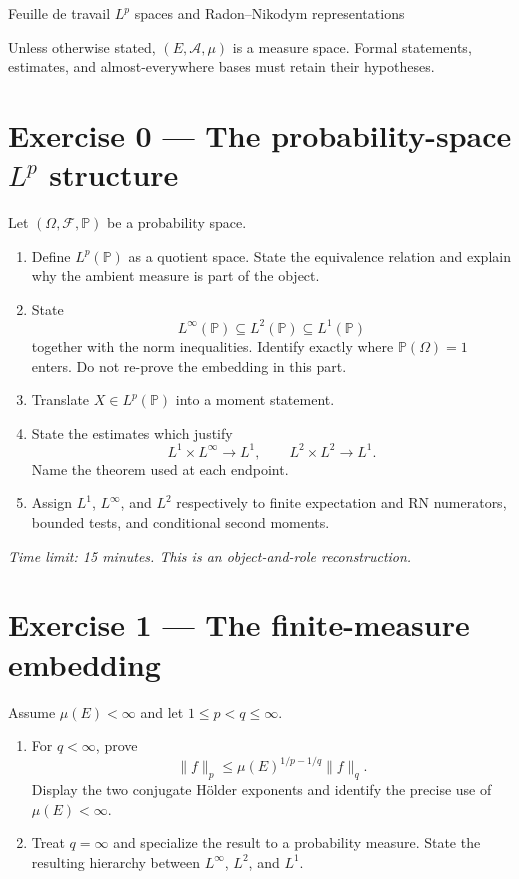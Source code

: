 \sheettitle
  {Feuille de travail}
  {$L^p$ spaces and Radon--Nikodym representations}

Unless otherwise stated, $(E,\mathcal A,\mu)$ is a measure space. Formal statements, estimates, and almost-everywhere bases must retain their hypotheses.

\section*{Exercise 0 — The probability-space $L^p$ structure}

Let $(\Omega,\mathcal F,\mathbb P)$ be a probability space.
\begin{enumerate}
  \item Define $L^p(\mathbb P)$ as a quotient space. State the equivalence relation and explain why the ambient measure is part of the object.
  \item State
  \[
  L^\infty(\mathbb P)
  \subseteq
  L^2(\mathbb P)
  \subseteq
  L^1(\mathbb P)
  \]
  together with the norm inequalities. Identify exactly where $\mathbb P(\Omega)=1$ enters. Do not re-prove the embedding in this part.
  \item Translate $X\in L^p(\mathbb P)$ into a moment statement.
  \item State the estimates which justify
  \[
  L^1\times L^\infty\longrightarrow L^1,
  \qquad
  L^2\times L^2\longrightarrow L^1.
  \]
  Name the theorem used at each endpoint.
  \item Assign $L^1$, $L^\infty$, and $L^2$ respectively to finite expectation and RN numerators, bounded tests, and conditional second moments.
\end{enumerate}

\emph{Time limit: 15 minutes. This is an object-and-role reconstruction.}

\section*{Exercise 1 — The finite-measure embedding}

Assume $\mu(E)<\infty$ and let $1\le p<q\le\infty$.
\begin{enumerate}
  \item For $q<\infty$, prove
  \[
  \|f\|_p
  \le
  \mu(E)^{1/p-1/q}\|f\|_q.
  \]
  Display the two conjugate Hölder exponents and identify the precise use of $\mu(E)<\infty$.
  \item Treat $q=\infty$ and specialize the result to a probability measure. State the resulting hierarchy between $L^\infty$, $L^2$, and $L^1$.
\end{enumerate}

